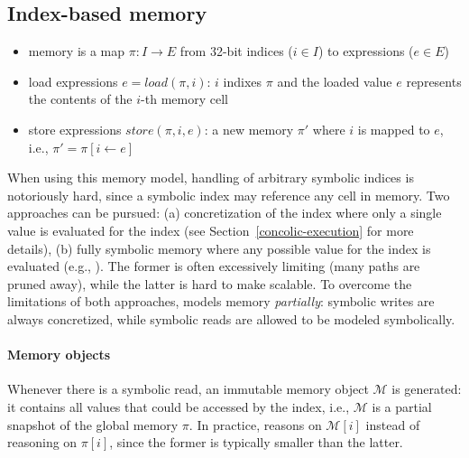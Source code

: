 \subsection{Index-based memory~\cite{MAYHEM-SP12}}
\begin{itemize}
  \item memory is a map $\pi : I \to E$ from 32-bit indices ($i \in I$) to expressions ($e \in E$)
  \item load expressions $e = load(\pi, i)$: $i$ indixes $\pi$ and the loaded value $e$ represents the contents of the $i$-th memory cell
  \item store expressions $store(\pi, i, e)$: a new memory $\pi'$ where $i$ is mapped to $e$, i.e., $\pi' = \pi[i \gets e]$
\end{itemize}
When using this memory model, handling of arbitrary symbolic indices is notoriously hard, since a symbolic index may reference any cell in memory. Two approaches can be pursued: (a) concretization of the index where only a single value is evaluated for the index (see Section~\ref{concolic-execution} for more details), (b) fully symbolic memory where any possible value for the index is evaluated (e.g., \cite{BAP-CAV11}). The former is often excessively limiting (many paths are pruned away), while the latter is hard to make scalable. To overcome the limitations of both approaches, \cite{MAYHEM-SP12} models memory {\em partially}: symbolic writes are always concretized, while symbolic reads are allowed to be modeled symbolically.

\paragraph{Memory objects} Whenever there is a symbolic read, an immutable memory object $\mathcal{M}$ is generated:  it contains all values that could be accessed by the index, i.e., $\mathcal{M}$ is a partial snapshot of the global memory $\pi$. In practice, \cite{MAYHEM-SP12} reasons on $\mathcal{M}[i]$ instead of reasoning on $\pi[i]$, since the former is typically smaller than the latter.

